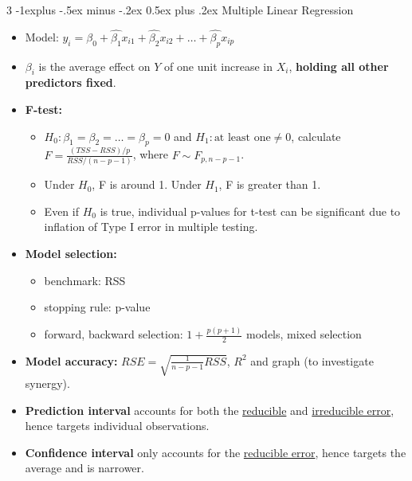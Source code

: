 \documentclass[10pt, landscape]{article}
\makeatletter
\renewcommand{\subsection}{\@startsection{subsection}{2}{0mm}%
  {-1explus -.5ex minus -.2ex}%
  {0.5ex plus .2ex}%
{\normalfont\normalsize\bfseries}}
\makeatother
\begin{document}
\begin{multicols*}{3}
    \subsection{Multiple Linear Regression}
    \begin{itemize}
      \item Model: $\hat{y_i} = \hat{\beta_0} + \hat{\beta_1}x_{i1} + \hat{\beta_2}x_{i2} + \ldots + \hat{\beta_p}x_{ip}$
      \item $\beta_i$ is the average effect on $Y$ of one unit increase in $X_i$, \textbf{holding all other predictors fixed}.
      \item \textbf{F-test:} 
      \begin{itemize}
        \item $H_0: \beta_1 = \beta_2 = \ldots = \beta_p = 0$ and $H_1: \text{at least one} \neq 0$, calculate $F = \frac{(TSS - RSS)/p}{RSS/(n-p-1)}$, where $F \sim F_{p, n-p-1}$.
        \item Under $H_0$, F is around 1. Under $H_1$, F is greater than 1.
        \item Even if $H_0$ is true, individual p-values for t-test can be significant due to inflation of Type I error in multiple testing.
      \end{itemize}
      \item \textbf{Model selection:}
      \begin{itemize}
        \item benchmark: RSS
        \item stopping rule: p-value
        \item forward, backward selection: $1+\frac{p(p+1)}{2}$ models, mixed selection
      \end{itemize}
      \item \textbf{Model accuracy:} $RSE = \sqrt{\frac{1}{n-p-1} RSS}$, $R^2$ and graph (to investigate synergy).
      \item \textbf{Prediction interval} accounts for both the \uline{reducible} and \uline{irreducible error}, hence targets individual observations.
      \item \textbf{Confidence interval} only accounts for the \uline{reducible error}, hence targets the average and is narrower.
    \end{itemize}


\end{multicols*}
\end{document}
